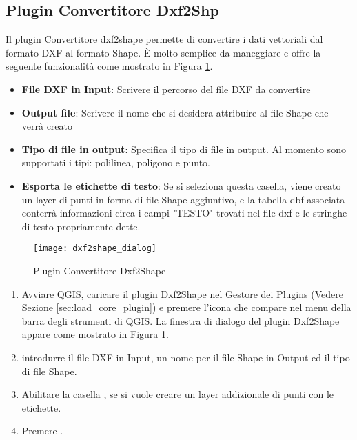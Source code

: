 
\subsection{Plugin Convertitore Dxf2Shp}


Il plugin Convertitore dxf2shape permette di convertire i dati vettoriali dal formato DXF al formato Shape. È molto semplice da maneggiare e offre la seguente funzionalità come mostrato in Figura \ref{fig:dxf2shape_dialog}.

\begin{itemize}
\item \textbf{File DXF in Input}: Scrivere il percorso del file DXF da convertire
\item \textbf{Output file}: Scrivere il nome che si desidera attribuire al file Shape che verrà creato
\item \textbf{Tipo di file in output}: Specifica il tipo di file in output. Al momento sono supportati i tipi: polilinea, poligono e punto.
\item \textbf{Esporta le etichette di testo}: Se si seleziona questa casella, viene creato un layer di punti in forma di file Shape aggiuntivo, e la tabella dbf associata conterrà informazioni circa i campi "TESTO" trovati nel file dxf e le stringhe di testo propriamente dette.
\end{itemize}

\begin{figure}[ht]
   \begin{center}
   \caption{Plugin Convertitore Dxf2Shape \nixcaption}\label{fig:dxf2shape_dialog}\smallskip
   \texttt{[image: dxf2shape\_dialog]}
\end{center}
\end{figure}

\begin{enumerate}
  \item Avviare QGIS, caricare il plugin Dxf2Shape nel Gestore dei Plugins (Vedere Sezione \ref{sec:load_core_plugin}) e premere l'icona  che compare nel menu della barra degli strumenti di QGIS. La finestra di dialogo del plugin Dxf2Shape appare come mostrato in Figura \ref{fig:dxf2shape_dialog}.
  \item introdurre il file DXF in Input, un nome per il file Shape in Output ed il tipo di file Shape.
  \item Abilitare la casella , se si vuole creare un layer addizionale di punti con le etichette.
  \item Premere . 
\end{enumerate}

\newpage



